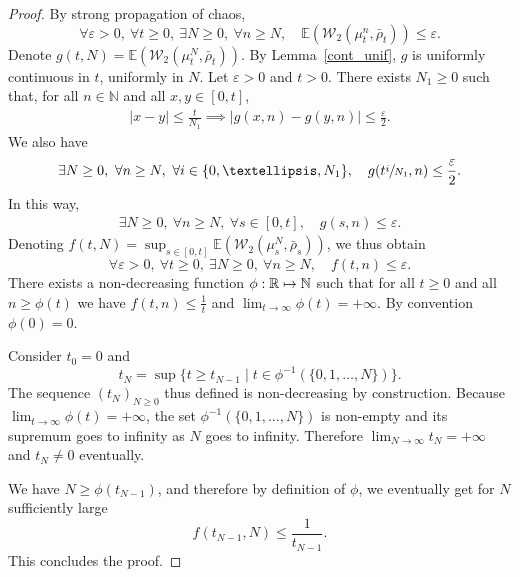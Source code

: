 \documentclass[11pt]{article}
\newcommand\mto{\mathchoice{\longmapsto}{\mapsto}{\mapsto}{\mapsto}}
\let\epsilon\varepsilon
\let\sep\mid
\theoremstyle{plain}
\theoremstyle{definition}
\begin{document}
\begin{proof}
By strong propagation of chaos,
\begin{equation}\label{Conv_non_unif_base}
\forall \epsilon>0,\ \forall t\geq0,\ \exists N\geq0,\ \forall n\geq N,\quad \mathbb{E}\left(\mathcal{W}_2\left(\mu^n_{t},\bar{\rho}_{t}\right)\right)\leq \epsilon.
\end{equation}
Denote $g(t,N)=\mathbb{E}\left(\mathcal{W}_2\left(\mu^N_{t},\bar{\rho}_{t}\right)\right)$. By Lemma~\ref{cont_unif}, $g$ is uniformly continuous in $t$, uniformly in $N$. Let $\epsilon>0$ and $t>0$. There exists $N_1\geq0$ such that, for all $n\in\mathbb{N}$ and all $x,y\in[0,t]$,
\begin{align*}
|x-y|\leq\frac{t}{N_1}\implies |g(x,n)-g(y,n)|\leq\frac{\epsilon}{2}.
\end{align*}
We also have\vspace*{-3pt}
\[
\exists N\geq0,\ \forall n\geq N,\ \forall i\in \{0,\dots,N_1\},\quad g(t\sfrac{i}{N_1},n)\leq \frac{\epsilon}{2}.
\]
In this way,\vspace*{-3pt}
\begin{align*}
\exists N\geq0,\ \forall n\geq N,\ \forall s\in [0,t],\quad g(s,n)\leq \epsilon.
\end{align*}
Denoting $f(t,N)=\sup_{s\in[0,t]}\mathbb{E}\left(\mathcal{W}_2\left(\mu^N_{s},\bar{\rho}_{s}\right)\right)$, we thus obtain
\begin{equation}\label{Conv_non_unif_sup}
\forall \epsilon>0,\ \forall t\geq0,\ \exists N\geq0,\ \forall n\geq N,\quad f(t,n)\leq \epsilon.
\end{equation}
There exists a non-decreasing function $\phi:\mathbb{R}\mto \mathbb{N}$ such that for all $t\geq0$ and all $n\geq \phi(t)$ we have $f(t,n)\leq\frac{1}{t}$ and $\lim_{t\to\infty}\phi(t)=+\infty$. By convention $\phi(0)=0$.

Consider $t_0=0$ and\vspace*{-3pt}
\[ t_N=\sup\{t\geq t_{N-1}\sep t\in\phi^{-1}(\{0,1,\dots,N\})\}.
\]
The sequence $(t_N)_{N\geq0}$ thus defined is non-decreasing by construction. Because $\lim_{t\to\infty}\phi(t)=+\infty$, the set $\phi^{-1}(\{0,1,\dots,N\})$ is non-empty and its supremum goes to infinity as $N$ goes to infinity. Therefore $\lim_{N\to\infty}t_N=+\infty$ and $t_N\neq0$ eventually.

We have $N\geq\phi(t_{N-1})$, and therefore by definition of $\phi$, we eventually get for $N$ sufficiently large\vspace*{-3pt}
\[
f(t_{N-1},N)\leq\frac{1}{t_{N-1}}.
\]
This concludes the proof.
\end{proof}
\end{document}
